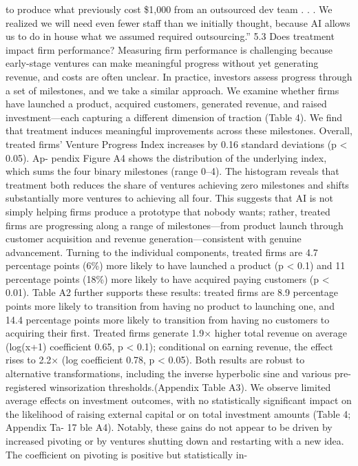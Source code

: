 to produce what previously cost \$1,000 from an outsourced dev team . . . We realized we will need
even fewer staff than we initially thought, because AI allows us to do in house what we assumed
required outsourcing.”
5.3
Does treatment impact firm performance?
Measuring firm performance is challenging because early-stage ventures can make meaningful progress
without yet generating revenue, and costs are often unclear. In practice, investors assess progress
through a set of milestones, and we take a similar approach.
We examine whether firms have
launched a product, acquired customers, generated revenue, and raised investment—each capturing
a different dimension of traction (Table 4).
We find that treatment induces meaningful improvements across these milestones.
Overall,
treated firms’ Venture Progress Index increases by 0.16 standard deviations (p < 0.05).
Ap-
pendix Figure A4 shows the distribution of the underlying index, which sums the four binary
milestones (range 0–4). The histogram reveals that treatment both reduces the share of ventures
achieving zero milestones and shifts substantially more ventures to achieving all four. This suggests
that AI is not simply helping firms produce a prototype that nobody wants; rather, treated firms
are progressing along a range of milestones—from product launch through customer acquisition and
revenue generation—consistent with genuine advancement. Turning to the individual components,
treated firms are 4.7 percentage points (6\%) more likely to have launched a product (p < 0.1) and
11 percentage points (18\%) more likely to have acquired paying customers (p < 0.01). Table A2
further supports these results: treated firms are 8.9 percentage points more likely to transition
from having no product to launching one, and 14.4 percentage points more likely to transition from
having no customers to acquiring their first. Treated firms generate 1.9× higher total revenue on
average (log(x+1) coefficient 0.65, p < 0.1); conditional on earning revenue, the effect rises to 2.2×
(log coefficient 0.78, p < 0.05). Both results are robust to alternative transformations, including the
inverse hyperbolic sine and various pre-registered winsorization thresholds.(Appendix Table A3).
We observe limited average effects on investment outcomes, with no statistically significant impact
on the likelihood of raising external capital or on total investment amounts (Table 4; Appendix Ta-
17
ble A4).
Notably, these gains do not appear to be driven by increased pivoting or by ventures shutting
down and restarting with a new idea. The coefficient on pivoting is positive but statistically in-
